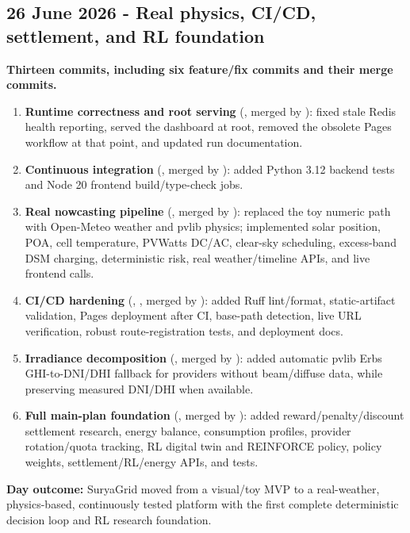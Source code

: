 \documentclass[10pt,a4paper]{article}
\begin{document}
\subsection{26 June 2026 - Real physics, CI/CD, settlement, and RL foundation}

\textbf{Thirteen commits, including six feature/fix commits and their merge commits.}

\begin{enumerate}
  \item \textbf{Runtime correctness and root serving} (, merged by ):
        fixed stale Redis health reporting, served the dashboard at root, removed the obsolete
        Pages workflow at that point, and updated run documentation.
  \item \textbf{Continuous integration} (, merged by ):
        added Python 3.12 backend tests and Node 20 frontend build/type-check jobs.
  \item \textbf{Real nowcasting pipeline} (, merged by ):
        replaced the toy numeric path with Open-Meteo weather and pvlib physics; implemented
        solar position, POA, cell temperature, PVWatts DC/AC, clear-sky scheduling, excess-band
        DSM charging, deterministic risk, real weather/timeline APIs, and live frontend calls.
  \item \textbf{CI/CD hardening} (, , merged by ):
        added Ruff lint/format, static-artifact validation, Pages deployment after CI, base-path
        detection, live URL verification, robust route-registration tests, and deployment docs.
  \item \textbf{Irradiance decomposition} (, merged by ):
        added automatic pvlib Erbs GHI-to-DNI/DHI fallback for providers without beam/diffuse data,
        while preserving measured DNI/DHI when available.
  \item \textbf{Full main-plan foundation} (, merged by ):
        added reward/penalty/discount settlement research, energy balance, consumption profiles,
        provider rotation/quota tracking, RL digital twin and REINFORCE policy, policy weights,
        settlement/RL/energy APIs, and tests.
\end{enumerate}

\textbf{Day outcome:} SuryaGrid moved from a visual/toy MVP to a real-weather, physics-based,
continuously tested platform with the first complete deterministic decision loop and RL research
foundation.
\end{document}

